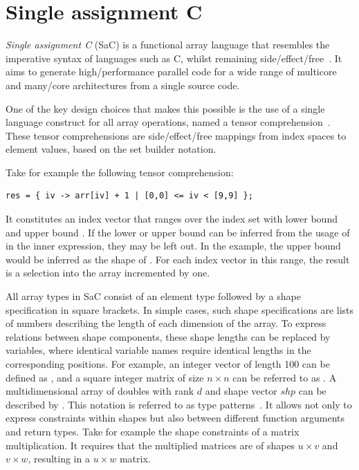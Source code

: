 \section{Single assignment C}
\emph{Single assignment C} (SaC) is a functional array language that resembles the imperative syntax of languages such as C, whilst remaining side\-/effect\-/free~\cite{grelck2006sac,grelck2012single}.
It aims to generate high\-/performance parallel code for a wide range of multicore and many\-/core architectures from a single source code.

One of the key design choices that makes this possible is the use of a single language construct for all array operations, named a tensor comprehension~\cite{scholz2021tensor}.
These tensor comprehensions are side\-/effect\-/free mappings from index spaces to element values, based on the set builder notation.

Take for example the following tensor comprehension:
\begin{verbatim}
res = { iv -> arr[iv] + 1 | [0,0] <= iv < [9,9] };
\end{verbatim}

It constitutes an index vector  that ranges over the index set with lower bound \code{[0,0]} and upper bound \code{[9,9]}.
If the lower or upper bound can be inferred from the usage of  in the inner expression, they may be left out.
In the example, the upper bound would be inferred as the shape of .
For each index vector in this range, the result is a selection into the array  incremented by one.

All array types in SaC consist of an element type followed by a shape specification in square brackets.
In simple cases, such shape specifications are lists of numbers describing the length of each dimension of the array.
To express relations between shape components, these shape lengths can be replaced by variables, where identical variable names require identical lengths in the corresponding positions.
For example, an integer vector of length \num{100} can be defined as , and a square integer matrix of size $n \times n$ can be referred to as .
A multidimensional array of doubles with rank $d$ and shape vector $shp$ can be described by .
This notation is referred to as type patterns~\cite{aaldering2024type}.
It allows not only to express constraints within shapes but also between different function arguments and return types.
Take for example the shape constraints of a matrix multiplication.
It requires that the multiplied matrices are of shapes $u \times v$ and $v \times w$, resulting in a $u \times w$ matrix.


